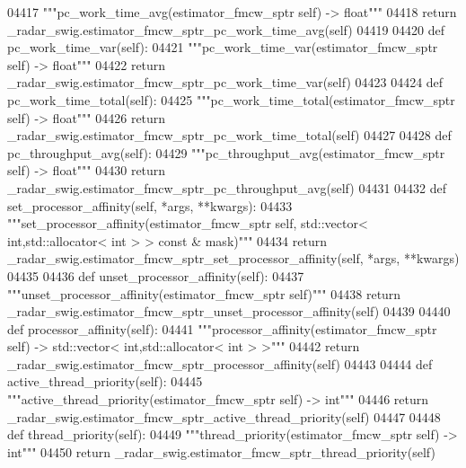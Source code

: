 \begin{DoxyCode}
{{{{{{{{{{{{{{{04417         \textcolor{stringliteral}{"""pc\_work\_time\_avg(estimator\_fmcw\_sptr self) -> float"""}
04418         \textcolor{keywordflow}{return} \_radar\_swig.estimator\_fmcw\_sptr\_pc\_work\_time\_avg(self)
04419 
04420     \textcolor{keyword}{def }pc_work_time_var(self):
04421         \textcolor{stringliteral}{"""pc\_work\_time\_var(estimator\_fmcw\_sptr self) -> float"""}
04422         \textcolor{keywordflow}{return} \_radar\_swig.estimator\_fmcw\_sptr\_pc\_work\_time\_var(self)
04423 
04424     \textcolor{keyword}{def }pc_work_time_total(self):
04425         \textcolor{stringliteral}{"""pc\_work\_time\_total(estimator\_fmcw\_sptr self) -> float"""}
04426         \textcolor{keywordflow}{return} \_radar\_swig.estimator\_fmcw\_sptr\_pc\_work\_time\_total(self)
04427 
04428     \textcolor{keyword}{def }pc_throughput_avg(self):
04429         \textcolor{stringliteral}{"""pc\_throughput\_avg(estimator\_fmcw\_sptr self) -> float"""}
04430         \textcolor{keywordflow}{return} \_radar\_swig.estimator\_fmcw\_sptr\_pc\_throughput\_avg(self)
04431 
04432     \textcolor{keyword}{def }set_processor_affinity(self, *args, **kwargs):
04433         \textcolor{stringliteral}{"""set\_processor\_affinity(estimator\_fmcw\_sptr self, std::vector< int,std::allocator< int > > const
       & mask)"""}
04434         \textcolor{keywordflow}{return} \_radar\_swig.estimator\_fmcw\_sptr\_set\_processor\_affinity(self, *args, **kwargs)
04435 
04436     \textcolor{keyword}{def }unset_processor_affinity(self):
04437         \textcolor{stringliteral}{"""unset\_processor\_affinity(estimator\_fmcw\_sptr self)"""}
04438         \textcolor{keywordflow}{return} \_radar\_swig.estimator\_fmcw\_sptr\_unset\_processor\_affinity(self)
04439 
04440     \textcolor{keyword}{def }processor_affinity(self):
04441         \textcolor{stringliteral}{"""processor\_affinity(estimator\_fmcw\_sptr self) -> std::vector< int,std::allocator< int > >"""}
04442         \textcolor{keywordflow}{return} \_radar\_swig.estimator\_fmcw\_sptr\_processor\_affinity(self)
04443 
04444     \textcolor{keyword}{def }active_thread_priority(self):
04445         \textcolor{stringliteral}{"""active\_thread\_priority(estimator\_fmcw\_sptr self) -> int"""}
04446         \textcolor{keywordflow}{return} \_radar\_swig.estimator\_fmcw\_sptr\_active\_thread\_priority(self)
04447 
04448     \textcolor{keyword}{def }thread_priority(self):
04449         \textcolor{stringliteral}{"""thread\_priority(estimator\_fmcw\_sptr self) -> int"""}
04450         \textcolor{keywordflow}{return} \_radar\_swig.estimator\_fmcw\_sptr\_thread\_priority(self)
}}}}}}}}}}}}}}}
\end{DoxyCode}
